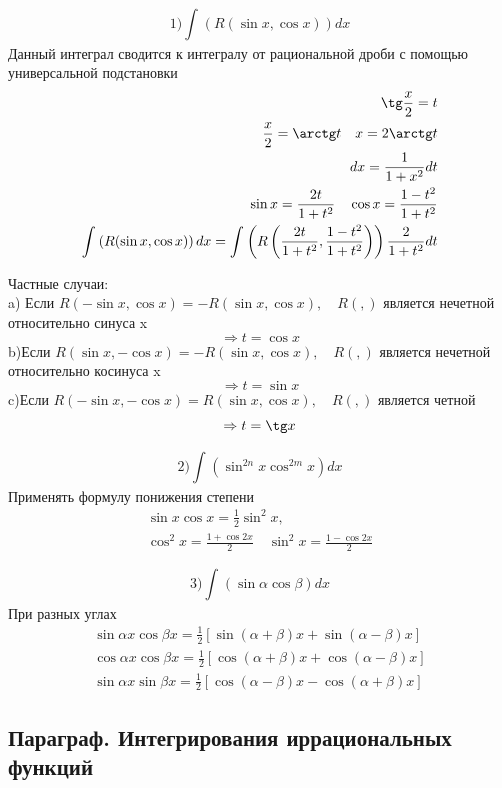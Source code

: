 \documentclass[a4paper, 12pt]{article}
\begin{document}
\[
   1)\int_{}^{}\left(R(\sin x,\cos x)\right)dx
\]
Данный интеграл сводится к интегралу от рациональной дроби с помощью универсальной подстановки
\begin{align*}
  \tg \frac{x}{2} = t\\
  \frac{x}{2} = \arctg t \quad x = 2\arctg t\\
  dx = \frac{1}{1 + x^2} dt\\
  \sin x = \frac{2t}{1 + t^2} \quad  \cos x = \frac{1-t^2}{1+t^2}\\
  \int_{}^{}\left(R(\sin x,\cos x)\right)dx = \int_{}^{}\left(R\left(\frac{2t}{1 + t^2},\frac{1-t^2}{1+t^2}\right)\right)\frac{2}{1+t^2}dt 
\end{align*}

Частные случаи:\\
a) Если $ R(-\sin x,\cos x) = -R(\sin x, \cos x), \quad R(,) $ является нечетной относительно синуса x
\[
   \Rightarrow t = \cos x
 \] 
b)Если $ R(\sin x,-\cos x) = -R(\sin x, \cos x), \quad R(,) $ является нечетной относительно косинуса x
\[
  \Rightarrow t = \sin x 
\]
c)Если $ R(-\sin x,-\cos x) = R(\sin x, \cos x), \quad R(,) $ является четной
\[
  \Rightarrow t = \tg x
\]

\[
  2) \int_{}^{}\left(\sin^{2n}x \cos^{2m}x\right)dx 
\]
Применять формулу понижения степени
\begin{align*}
  \sin x \cos x = \frac{1}{2} \sin^2 x,\\
  \cos^2 x = \frac{1+ \cos 2x}{2} \quad \sin^2 x = \frac{1 - \cos 2x}{2}
\end{align*}

\[
  3) \int_{}^{}\left(\sin \alpha \cos \beta \right)dx 
\]
При разных углах 
\begin{align*}
  \sin \alpha x \cos \beta x = \frac{1}{2}\left[\sin(\alpha + \beta )x + \sin(\alpha -\beta )x\right]\\
  \cos \alpha x \cos \beta x = \frac{1}{2}\left[\cos(\alpha + \beta )x + \cos(\alpha -\beta )x\right]\\
  \sin \alpha x \sin \beta x = \frac{1}{2}\left[\cos(\alpha - \beta )x - \cos(\alpha +\beta )x\right]
\end{align*}


\subsection{Параграф. Интегрирования иррациональных функций}
\end{document}
